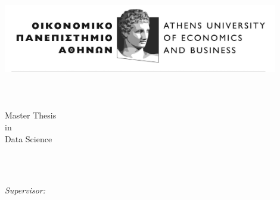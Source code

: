 %


\begin{titlepage}
	\tgherosfont
	\centering

	\includegraphics[width=12cm]{figs/aueb_logo.jpg} \\[2mm]
	\textsf{\thesisUniversityInstitute} \\
	\textsf{\thesisUniversityDepartment} \\
	\textsf{\thesisUniversityCity} \\
	\vfill
	\Large{Master Thesis} \\
	\textsf{in} \\
	\Large{Data Science}

	\vfill

	{\LARGE \textbf{\thesisTitle} \\[4mm]}
	{\Large \thesisAuthor} \\

	\vfill
    \vfill


	\begin{minipage}[t]{.27\textwidth}
		\raggedleft
		\textit{Supervisor:}
	\end{minipage}
	\hspace*{15pt}
	\begin{minipage}[t]{.65\textwidth}
		{\Large \thesisSupervisorTitle\ \thesisSupervisor} \\
	  	{\small \thesisSupervisorDepartment} \\[-1mm]
		{\small \thesisSupervisorUniversity}
	\end{minipage} \\[15mm]


\end{titlepage}
